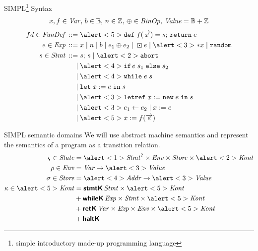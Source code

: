 \documentclass[aspectratio=169]{beamer}
\begin{document}
\begin{frame}{SIMPL\footnote{simple introductory made-up programming language} Syntax}
  \vspace{-2em}
  \small
  \begin{gather*}
    x,f \in \mathit{Var},\, b \in \mathbb{B},\, n \in \mathbb{Z},\, \oplus \in \mathit{BinOp},\,\mathit{Value} = \mathbb{B} + \mathbb{Z}
  \end{gather*}\vspace{-2em}
  \begin{align*}
    fd \in \ns{FunDef} \eDEF & \alert<5>{\kw{def}\; f(\vo{x}) = s;\,\kw{return}\; e} \\
    e \in \Exp \eDEF & x \eOR n \eOR b \eOR e_1 \oplus e_2 \eOR \boxdot e \eOR \alert<3>{*x} \eOR \kw{random}  \\
    s \in \Stmt \eDEF & s;\,s \eOR \alert<2>{\kw{abort}} \\
    \eOR & \alert<4>{\kw{if}\, e\; s_1 \; \kw{else} \; s_2} \\
    \eOR & \alert<4>{\kw{while}\; e\; s} \\
    \eOR & \kw{let}\; x := e \;\kw{in}\;s \\
    \eOR & \alert<3>{\kw{letref}\; x := \kw{new}\;e \;\kw{in}\;s} \\
    \eOR & \alert<3>{e_1 \update e_2} \eOR x := e \\
    \eOR & \alert<5>{x := f(\vo{e})}
  \end{align*}
\end{frame}
\begin{frame}{SIMPL semantic domains}
  \begingroup\footnotesize We will use abstract machine semantics and represent the semantics of a program as a transition relation.\endgroup
\begin{align*}
    \varsigma \in \State & = \alert<1>{\Stmt^? \times \Env \times \Store \times \alert<2>{\Kont}} \\
    \rho \in \Env & = \Var \to \alert<3>{\Value} \\ %
    \sigma \in \Store & = \alert<4>{\Addr} \to \alert<3>{\Value} \\ %
    \kappa \in \alert<5>{\Kont} & = \sTag{stmtK}{\Stmt \times \alert<5>{\Kont}} \\
                         & \disunion \sTag{whileK}{\Exp \times \Stmt \times \alert<5>{\Kont}} \\
                         & \disunion \sTag{retK}{\Var \times \Exp \times \Env \times \alert<5>{\Kont}} \\
                         & \disunion \sTag{haltK}
\end{align*}

\end{frame}
\end{document}
